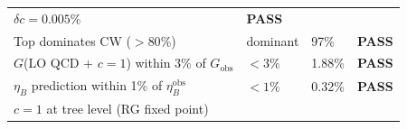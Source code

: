 \documentclass[
  11pt,
]{article}
\begin{document}
\begin{longtable}[]{@{}llll@{}}
\begin{minipage}[t]{0.22\columnwidth}
\(\delta c = 0.005\%\)\strut
\end{minipage} & \begin{minipage}[t]{0.22\columnwidth}\raggedright
\textbf{PASS}\strut
\end{minipage}\tabularnewline
\begin{minipage}[t]{0.22\columnwidth}\raggedright
Top dominates CW (\(> 80\%\))\strut
\end{minipage} & \begin{minipage}[t]{0.22\columnwidth}\raggedright
dominant\strut
\end{minipage} & \begin{minipage}[t]{0.22\columnwidth}\raggedright
97\%\strut
\end{minipage} & \begin{minipage}[t]{0.22\columnwidth}\raggedright
\textbf{PASS}\strut
\end{minipage}\tabularnewline
\begin{minipage}[t]{0.22\columnwidth}\raggedright
\(G\)(LO QCD + \(c=1\)) within 3\% of \(G_\text{obs}\)\strut
\end{minipage} & \begin{minipage}[t]{0.22\columnwidth}\raggedright
\(< 3\%\)\strut
\end{minipage} & \begin{minipage}[t]{0.22\columnwidth}\raggedright
1.88\%\strut
\end{minipage} & \begin{minipage}[t]{0.22\columnwidth}\raggedright
\textbf{PASS}\strut
\end{minipage}\tabularnewline
\begin{minipage}[t]{0.22\columnwidth}\raggedright
\(\eta_B\) prediction within 1\% of \(\eta_B^\text{obs}\)\strut
\end{minipage} & \begin{minipage}[t]{0.22\columnwidth}\raggedright
\(< 1\%\)\strut
\end{minipage} & \begin{minipage}[t]{0.22\columnwidth}\raggedright
0.32\%\strut
\end{minipage} & \begin{minipage}[t]{0.22\columnwidth}\raggedright
\textbf{PASS}\strut
\end{minipage}\tabularnewline
\begin{minipage}[t]{0.22\columnwidth}\raggedright
\(c = 1\) at tree level (RG fixed point)\strut
\end{minipage} & \begin{minipage}[t]{0.22\columnwidth}\raggedright

\end{minipage}
\end{longtable}
\end{document}
